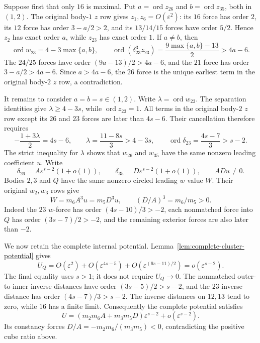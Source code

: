 \documentclass[11pt]{amsart}
\theoremstyle{remark}
\newcommand{\ord}{\operatorname{ord}}
\begin{document}
Suppose first that only $16$ is maximal. Put $a=\ord z_{26}$ and $b=\ord z_{35}$, both in $(1,2)$. The original body-$1$ $z$ row gives
$z_1,z_6=O(\varepsilon^2)$: its $16$ force has order $2$, its $12$ force has order $3-a/2>2$, and its $13/14/15$ forces have order $5/2$.
Hence $z_2$ has exact order $a$, while $z_{23}$ has exact order $1$.
If $a\ne b$, then
\[
 \ord w_{23}=4-3\max\{a,b\},\qquad
 \ord(\delta_{23}^3z_{23})=\frac{9\max\{a,b\}-13}{2}>4a-6.
\]
The $24/25$ forces have order $(9a-13)/2>4a-6$, and the $21$ force has order $3-a/2>4a-6$.
Since $a>4a-6$, the $26$ force is the unique earliest term in the original body-$2$ $z$ row, a contradiction.

It remains to consider $a=b=s\in(1,2)$. Write $\lambda=\ord w_{23}$.
The separation identities give $\lambda\ge4-3s$, while $\ord z_{23}=1$.
All terms in the original body-$2$ $z$ row except its $26$ and $23$ forces are later than $4s-6$. Their cancellation therefore requires
\[
 -\frac{1+3\lambda}{2}=4s-6,\qquad
 \lambda=\frac{11-8s}{3}>4-3s,\qquad
 \ord\delta_{23}=\frac{4s-7}{3}>s-2.
\]
The strict inequality for $\lambda$ shows that $w_{26}$ and $w_{35}$ have the same nonzero leading coefficient $u$. Write
\[
 \delta_{26}=A\varepsilon^{s-2}(1+o(1)),\qquad
 \delta_{35}=D\varepsilon^{s-2}(1+o(1)),\qquad ADu\ne0.
\]
Bodies $2,3$ and $Q$ have the same nonzero circled leading $w$ value $W$.
Their original $w_2,w_3$ rows give
\[
 W=m_6A^3u=m_5D^3u,\qquad (D/A)^3=m_6/m_5>0.
\]
Indeed the $23$ $w$-force has order $(4s-10)/3>-2$, each nonmatched force into $Q$ has order $(3s-7)/2>-2$, and the remaining exterior forces are also later than $-2$.

We now retain the complete internal potential. Lemma~\ref{lem:complete-cluster-potential} gives
\begin{equation}\label{eq:no45-relative-inner-potential}
 U_Q=O(\varepsilon^2)+O(\varepsilon^{4s-5})
      +O(\varepsilon^{(9s-11)/2})
      =o(\varepsilon^{s-2}).
\end{equation}
The final equality uses $s>1$; it does not require $U_Q\to0$.
The nonmatched outer-to-inner inverse distances have order $(3s-5)/2>s-2$, and the $23$ inverse distance has order $(4s-7)/3>s-2$.
The inverse distances on $12,13$ tend to zero, while $16$ has a finite limit.
Consequently the complete potential satisfies
\[
 U=(m_2m_6A+m_3m_5D)\varepsilon^{s-2}
      +o(\varepsilon^{s-2}).
\]
Its constancy forces $D/A=-m_2m_6/(m_3m_5)<0$, contradicting the positive cube ratio above.
\end{document}
